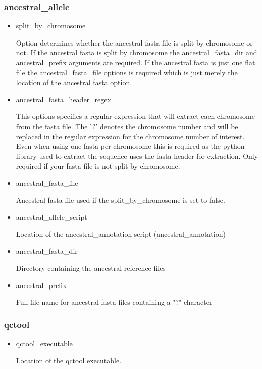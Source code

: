 \documentclass[a4paper,10pt]{article}
\begin{document}
\subsubsection{ancestral\_allele}
\begin{itemize}
\item split\_by\_chromosome

Option determines whether the ancestral fasta file is split by
chromosome or not. If the ancestral fasta is split by chromosome the
ancestral\_fasta\_dir and ancestral\_prefix arguments are required. If
the ancestral fasta is just one flat file the ancestral\_fasta\_file
options is required which is just merely the location of the ancestral
fasta option.

\item ancestral\_fasta\_header\_regex

This options specifies a regular expression that will extract each
chromosome from the fasta file. The '?' denotes the chromosome number
and will be replaced in the regular expression for the chromosome
number of interest. Even when using one fasta per chromosome this is
required as the python library used to extract the sequence uses the
fasta header for extraction. Only required if your fasta file is not
split by chromosome.

\item ancestral\_fasta\_file

Ancestral fasta file used if the split\_by\_chromosome is set to false.

\item ancestral\_allele\_script

Location of the ancestral\_annotation script (ancestral\_annotation)
\item ancestral\_fasta\_dir 

Directory containing the ancestral reference files
\item ancestral\_prefix 

Full file name for ancestral fasta files containing a "?" character

\end{itemize}
\subsubsection{qctool}
\begin{itemize}
\item qctool\_executable

Location of the qctool executable.
\end{itemize}
\end{document}
